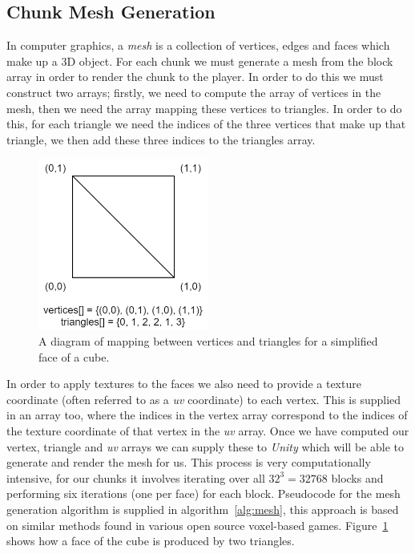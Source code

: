 \documentclass[12pt,notitlepage,a4paper]{report}
\newcommand{\unity}{\emph{Unity}}
\begin{document}
	\subsection{Chunk Mesh Generation}
	\label{sec:mesh}
	In computer graphics, a \emph{mesh} is a collection of vertices, edges and faces which make up a 3D object. For each chunk we must generate a mesh from the block array in order to render the chunk to the player. In order to do this we must construct two arrays; firstly, we need to compute the array of vertices in the mesh, then we need the array mapping these vertices to triangles. In order to do this, for each triangle we need the indices of the three vertices that make up that triangle, we then add these three indices to the triangles array.
	
	\begin{figure}[!ht]
		\centering
		\includegraphics[width=0.5\textwidth]{diag2.png}
		\caption{A diagram of mapping between vertices and triangles for a simplified face of a cube.}
		\label{fig:mesh}
	\end{figure}
	
	In order to apply textures to the faces we also need to provide a texture coordinate (often referred to as a \emph{uv} coordinate) to each vertex. This is supplied in an array too, where the indices in the vertex array correspond to the indices of the texture coordinate of that vertex in the \emph{uv} array. Once we have computed our vertex, triangle and \emph{uv} arrays we can supply these to \unity{} which will be able to generate and render the mesh for us. This process is very computationally intensive, for our chunks it involves iterating over all $32^3 = 32768$ blocks and performing six iterations (one per face) for each block. Pseudocode for the mesh generation algorithm is supplied in algorithm~\ref{alg:mesh}, this approach is based on similar methods found in various open source voxel-based games. Figure~\ref{fig:mesh} shows how a face of the cube is produced by two triangles.
	
\end{document}
